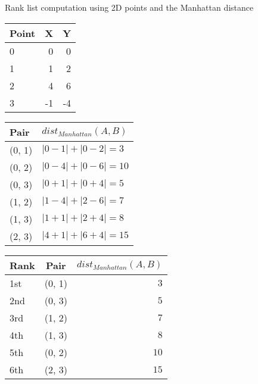 \begin{example}
  \centering
  \caption{Rank list computation using 2D points and the Manhattan distance}
  \label{ex:rank_list}

  \begin{subexample}{\linewidth}
    \centering
    \begin{tabular}{l r r}
      \toprule
      Point & X & Y \\
      \midrule
      0 & 0 & 0 \\
      1 & 1 & 2 \\
      2 & 4 & 6 \\
      3 & -1 & -4 \\
      \bottomrule
    \end{tabular}
  \end{subexample}

  \vspace{0.5cm}

  \begin{subexample}{\linewidth}
    \centering
    \begin{tabular}{l l}
      \toprule
      Pair & $dist_{Manhattan}(A, B)$ \\
      \midrule
      (0, 1) & $|0-1| + |0-2| = 3$ \\
      (0, 2) & $|0-4| + |0-6| = 10$ \\
      (0, 3) & $|0+1| + |0+4| = 5$ \\
      (1, 2) & $|1-4| + |2-6| = 7$ \\
      (1, 3) & $|1+1| + |2+4| = 8$ \\
      (2, 3) & $|4+1| + |6+4| = 15$ \\
      \bottomrule
    \end{tabular}
  \end{subexample}

  \vspace{0.5cm}

  \begin{subexample}{\linewidth}
    \centering
    \begin{tabular}{l c r}
      \toprule
      Rank & Pair & $dist_{Manhattan}(A, B)$ \\
      \midrule
      1st & (0, 1) & $3$ \\
      2nd & (0, 3) & $5$ \\
      3rd & (1, 2) & $7$ \\
      4th & (1, 3) & $8$ \\
      5th & (0, 2) & $10$ \\
      6th & (2, 3) & $15$ \\
      \bottomrule
    \end{tabular}
  \end{subexample}

\end{example}
